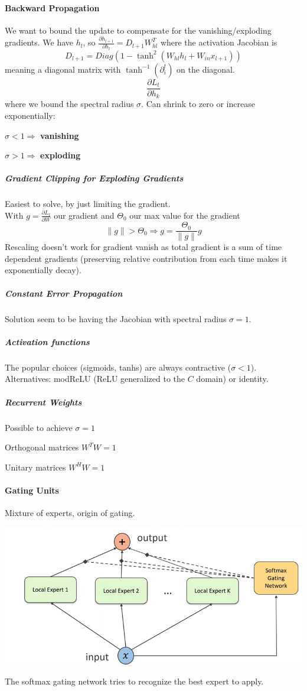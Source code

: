 \documentclass[10pt]{report}
\begin{document}
\paragraph{Backward Propagation}
We want to bound the update to compensate for the vanishing/exploding gradients. We have $h_l$, so $\frac{\partial h_{l+1}}{\partial h_l} = D_{l+1}W_{hl}^T$ where the activation Jacobian is $$D_{l+1} = Diag(1-\tanh^2(W_{hl}h_l + W_{in}x_{l+1}))$$
meaning a diagonal matrix with $\tanh^{-1}(\partial_i^t)$ on the diagonal.
$$\frac{\partial L_t}{\partial h_k} $$ %
where we bound the spectral radius $\sigma$. Can shrink to zero or increase exponentially:\begin{list}{}{}
	\item $\sigma < 1 \Rightarrow$ \textbf{vanishing}
	\item $\sigma > 1 \Rightarrow$ \textbf{exploding}
\end{list}
\subparagraph{Gradient Clipping for Exploding Gradients} Easiest to solve, by just limiting the gradient.\\
With $g=\frac{\partial L_t}{\partial W}$ our gradient and $\Theta_0$ our max value for the gradient
$$\|g\|>\Theta_0\Rightarrow g=\frac{\Theta_0}{\|g\|}g$$
Rescaling doesn't work for gradient vanish as total gradient is a sum of time dependent gradients (preserving relative contribution from each time makes it exponentially decay).
\subparagraph{Constant Error Propagation} Solution seem to be having the Jacobian with spectral radius $\sigma = 1$.
\subparagraph{Activation functions} The popular choices (sigmoids, tanhs) are always contractive ($\sigma < 1$). Alternatives: modReLU (ReLU generalized to the $C$ domain) or identity.
\subparagraph{Recurrent Weights} Possible to achieve $\sigma = 1$
\begin{list}{}{}
	\item Orthogonal matrices $W^TW = 1$
	\item Unitary matrices $W^H W = 1$
\end{list}
\paragraph{Gating Units} Mixture of experts, origin of gating.
\begin{center}
	\includegraphics[scale=0.5]{93.png}
\end{center}
The softmax gating network tries to recognize the best expert to apply.
\end{document}
